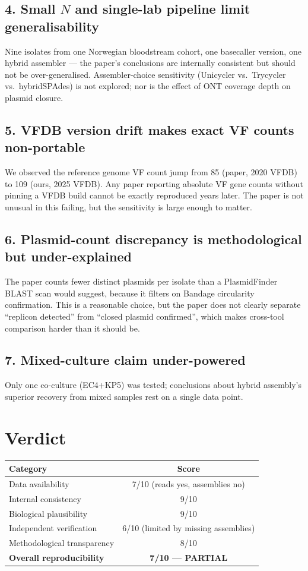 \documentclass[11pt,letterpaper]{article}
\begin{document}
\subsection*{4. Small $N$ and single-lab pipeline limit generalisability}
Nine isolates from one Norwegian bloodstream cohort, one basecaller version, one hybrid assembler --- the paper's conclusions are internally consistent but should not be over-generalised. Assembler-choice sensitivity (Unicycler vs.\ Trycycler vs.\ hybridSPAdes) is not explored; nor is the effect of ONT coverage depth on plasmid closure.

\subsection*{5. VFDB version drift makes exact VF counts non-portable}
We observed the reference genome VF count jump from 85 (paper, 2020 VFDB) to 109 (ours, 2025 VFDB). Any paper reporting absolute VF gene counts without pinning a VFDB build cannot be exactly reproduced years later. The paper is not unusual in this failing, but the sensitivity is large enough to matter.

\subsection*{6. Plasmid-count discrepancy is methodological but under-explained}
The paper counts fewer distinct plasmids per isolate than a PlasmidFinder BLAST scan would suggest, because it filters on Bandage circularity confirmation. This is a reasonable choice, but the paper does not clearly separate ``replicon detected'' from ``closed plasmid confirmed'', which makes cross-tool comparison harder than it should be.

\subsection*{7. Mixed-culture claim under-powered}
Only one co-culture (EC4+KP5) was tested; conclusions about hybrid assembly's superior recovery from mixed samples rest on a single data point.

\section{Verdict}

\begin{center}
\begin{tabular}{lc}
\toprule
Category & Score \\
\midrule
Data availability & 7/10 (reads yes, assemblies no) \\
Internal consistency & 9/10 \\
Biological plausibility & 9/10 \\
Independent verification & 6/10 (limited by missing assemblies) \\
Methodological transparency & 8/10 \\
\textbf{Overall reproducibility} & \textbf{7/10 --- PARTIAL} \\
\bottomrule
\end{tabular}
\end{center}
\end{document}

